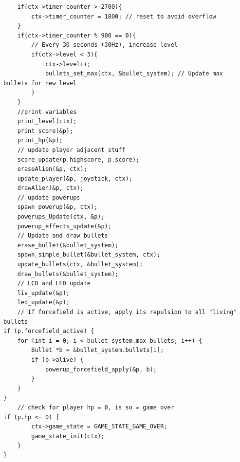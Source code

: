 \begin{lstlisting}
    if(ctx->timer_counter > 2700){
        ctx->timer_counter = 1800; // reset to avoid overflow
    }
    if(ctx->timer_counter % 900 == 0){
        // Every 30 seconds (30Hz), increase level
        if(ctx->level < 3){
            ctx->level++;
            bullets_set_max(ctx, &bullet_system); // Update max bullets for new level
        }
    }
    //print variables
    print_level(ctx);
    print_score(&p);
    print_hp(&p);
    // update player adjacent stuff
    score_update(p.highscore, p.score);      
    eraseAlien(&p, ctx);
    update_player(&p, joystick, ctx);
    drawAlien(&p, ctx);
    // update powerups
    spawn_powerup(&p, ctx);
    powerups_Update(ctx, &p);
    powerup_effects_update(&p);
    // Update and draw bullets
    erase_bullet(&bullet_system);
    spawn_simple_bullet(&bullet_system, ctx);
    update_bullets(ctx, &bullet_system);
    draw_bullets(&bullet_system);
    // LCD and LED update
    liv_update(&p);
    led_update(&p);
    // If forcefield is active, apply its repulsion to all "living" bullets
if (p.forcefield_active) {
    for (int i = 0; i < bullet_system.max_bullets; i++) {
        Bullet *b = &bullet_system.bullets[i];
        if (b->alive) {
            powerup_forcefield_apply(&p, b);
        }
    }
}
    // check for player hp = 0, is so = game over
if (p.hp <= 0) {
        ctx->game_state = GAME_STATE_GAME_OVER;
        game_state_init(ctx);
    }
}
\end{lstlisting}

